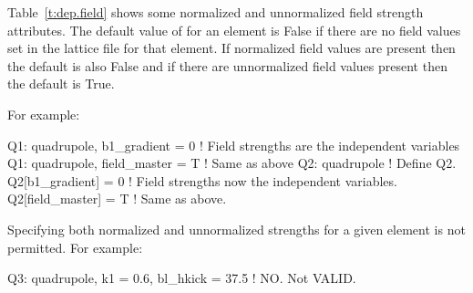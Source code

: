 Table~\ref{t:dep.field} shows some normalized and unnormalized field strength attributes.  The
default value of  for an element is False if there are no field values set in the
lattice file for that element. If normalized field values are present then the default is also False
and if there are unnormalized field values present then the default is True.

For example:
\begin{example}
  Q1: quadrupole, b1_gradient = 0   ! Field strengths are the independent variables
  Q1: quadrupole, field_master = T  ! Same as above
  Q2: quadrupole        ! Define Q2.
  Q2[b1_gradient] = 0   ! Field strengths now the independent variables.
  Q2[field_master] = T  ! Same as above.
\end{example}

Specifying both normalized and unnormalized strengths for a given element is not
permitted. For example:
\begin{example}
  Q3: quadrupole, k1 = 0.6, bl_hkick = 37.5  ! NO. Not VALID.
\end{example}

\begin{table}[ht]
\caption {Example normalized and unnormalized field strength attributes.}
\label{t:dep.field}
\end{table}


